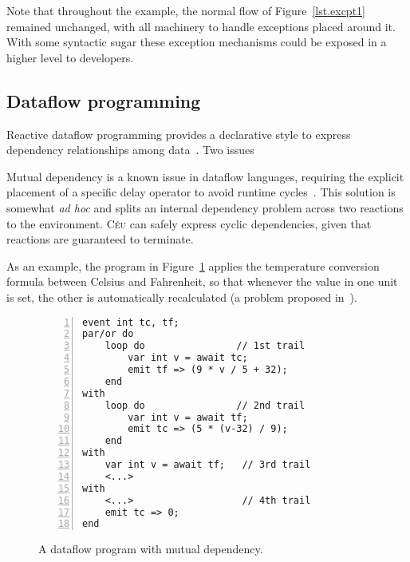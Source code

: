 \documentclass{acm_proc_article-sp}
\newcommand{\CEU}{\textsc{C\'{e}u}\xspace}
\newcommand{\code}[1] {{\small{\texttt{#1}}}}
\newcommand{\1}{\;}
\newcommand{\2}{\;\;}
\newcommand{\3}{\;\;\;}
\newcommand{\5}{\;\;\;\;\;}
\begin{document}
Note that throughout the example, the normal flow of Figure~\ref{lst.excpt1} 
remained unchanged, with all machinery to handle exceptions placed around it.
With some syntactic sugar these exception mechanisms could be exposed in a 
higher level to developers.

\subsection{Dataflow programming}
\label{sec.adv.frp}

\begin{comment}

terminate), which is fundamental to enable multiple dependencies from the -same 
source in dataflow programming (to be discussed in
-Sections~\ref{sec.sem}~and~\ref{sec.adv.frp}).

alternative to Esterel's abortion primitive that is required for dataflow 
support.
This modification makes lines of executions to rejoin in an equivalent way to 
topological traversal in dependency graphs of dataflow 
languages~\cite{rp.twelve,frp.survey}.
%
We also show that, based on the stacked execution for internal events, \CEU can 
describe mutual data dependency without requiring an explicit \emph{delay} 
operator to break cycles~\cite{frtime.embedding,luagravity.sblp}.
\end{comment}


Reactive dataflow programming provides a declarative style to express 
dependency relationships among data~\cite{frp.survey}.
%
Two issues

Mutual dependency is a known issue in dataflow languages, requiring the 
explicit placement of a specific delay operator to avoid runtime
cycles~\cite{frtime.embedding,luagravity.sblp}.
This solution is somewhat \emph{ad hoc} and splits an internal dependency 
problem across two reactions to the environment.
%
\CEU can safely express cyclic dependencies, given that reactions are 
guaranteed to terminate.

As an example, the program in Figure~\ref{lst.frp2} applies the temperature 
conversion formula between Celsius and Fahrenheit, so that whenever the value 
in one unit is set, the other is automatically recalculated (a problem proposed 
in~\cite{frp.survey}).

\begin{figure}[t]
\begin{lstlisting}[numbers=left,xleftmargin=2em]
event int tc, tf;
par/or do
    loop do                // 1st trail
        var int v = await tc;
        emit tf => (9 * v / 5 + 32);
    end
with
    loop do                // 2nd trail
        var int v = await tf;
        emit tc => (5 * (v-32) / 9);
    end
with
    var int v = await tf;   // 3rd trail
    <...>
with
    <...>                   // 4th trail
    emit tc => 0;
end
\end{lstlisting}
\caption{ A dataflow program with mutual dependency.
\label{lst.frp2}
}
\end{figure}
\end{document}
